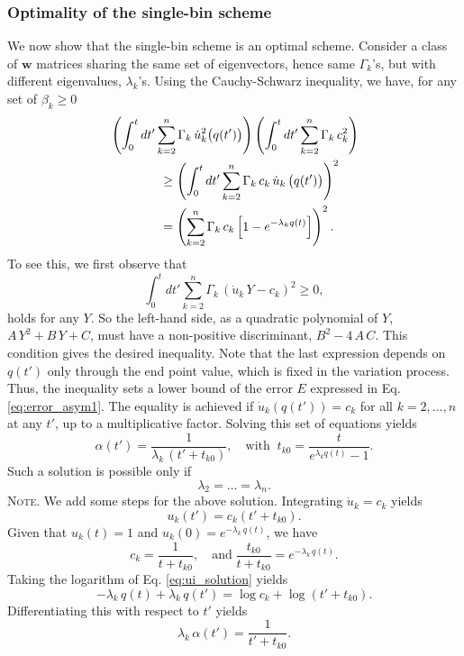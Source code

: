 \documentclass[reprint]{revtex4-1}
\newcommand{\note}[1]{{\color{DarkGreen}\footnotesize \textsc{Note.} #1}}
\newcommand{\Err}{E}
\begin{document}
\subsubsection{\label{sec:optWL}
Optimality of the single-bin scheme}



We now show
that the single-bin scheme
is an optimal scheme.
%
Consider a class of $\mathbf w$ matrices
sharing the same set of eigenvectors,
hence same $\Gamma_k$'s,
but with different eigenvalues, $\lambda_k$'s.
%
Using the Cauchy-Schwarz inequality, we have,
for any set of $\beta_k \ge 0$
%
\begin{align}
&
\left(
  \int_0^t dt'
    \sum_{k = 2}^n
      \Gamma_k \, \dot u_k^2\bigl( q(t') \bigr)
\right)
%
\left(
  \int_0^t dt'
    \sum_{k = 2}^n
      \Gamma_k \, c_k^2
\right)
%
\notag
\\
&
\qquad \qquad
\ge
\left(
  \int_0^t dt'
    \sum_{k = 2}^n
      \Gamma_k \, c_k \, \dot u_k \, \bigl( q(t') \bigr)
\right)^2
\notag
\\
&
\qquad \qquad
=
\left(
  \sum_{k = 2}^n \Gamma_k \, c_k
    \left[
      1 - e^{ -\lambda_k q(t) }
    \right]
\right)^2.
\notag
\end{align}
%
To see this, we first observe that
$$
\int_0^t
  dt' \sum_{k = 2}^n \Gamma_k \,
    \left( \dot u_k \, Y - c_k \right)^2
\ge 0,
$$
holds for any $Y$.
%
So the left-hand side,
as a quadratic polynomial of $Y$,
$A \, Y^2 + B \, Y + C$,
must have a non-positive discriminant,
$B^2 - 4 \, A \, C$.
%
This condition gives the desired inequality.
%
Note that the last expression depends on
$q(t')$ only through the end point value,
which is fixed in the variation process.
%
Thus, the inequality sets a lower bound
of the error $\Err$
expressed in Eq. \eqref{eq:error_asym1}.
%
The equality is achieved
if $\dot u_k\left( q(t') \right) = c_k$
for all $k = 2, \dots, n$ at any $t'$,
up to a multiplicative factor.
%
Solving this set of equations yields
$$
\alpha(t') = \frac{              1              }
                  { \lambda_k \, (t' + t_{k0} ) },
\quad
\mathrm{with\;\;}
t_{k0} = \frac{             t            }
              { e^{ \lambda_k q(t) } - 1 }.
$$
Such a solution is possible only if
\begin{equation}
\lambda_2 = \dots = \lambda_n.
\end{equation}
%
\note{
  We add some steps for the above solution.
  Integrating $\dot u_k = c_k$ yields
  \begin{equation}
  u_k(t') = c_k \left(t' + t_{k0} \right).
  \label{eq:ui_solution}
  \end{equation}
  Given that $u_k(t) = 1$ and $u_k(0) = e^{-\lambda_k \, q(t)}$,
  we have
  $$
  c_k = \frac{ 1 }{ t + t_{k0} },
  \quad
  \mathrm{and\;}
  \frac{ t_{k0} } { t + t_{k0} }
  =
  e^{ -\lambda_k \, q(t) }.
  $$
  Taking the logarithm of Eq. \eqref{eq:ui_solution} yields
  $$
  -\lambda_k \, q(t) + \lambda_k \, q(t')
  = \log c_k + \log\left( t' + t_{k0} \right).
  $$
  Differentiating this with respect to $t'$ yields
  $$
  \lambda_k \, \alpha(t') = \frac{ 1 } { t' + t_{k0} }.
  $$
}
\end{document}
